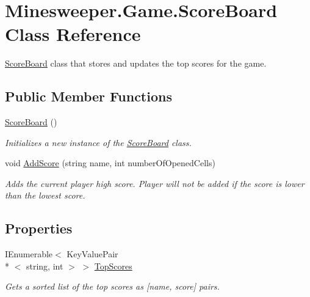 \hypertarget{class_minesweeper_1_1_game_1_1_score_board}{\section{Minesweeper.\+Game.\+Score\+Board Class Reference}
\label{class_minesweeper_1_1_game_1_1_score_board}
}


\hyperlink{class_minesweeper_1_1_game_1_1_score_board}{Score\+Board} class that stores and updates the top scores for the game.  


\subsection*{Public Member Functions}
\begin{DoxyCompactItemize}
\item 
\hyperlink{class_minesweeper_1_1_game_1_1_score_board_a30a6adbef4b4a9c0c7720df2725d3bf5}{Score\+Board} ()
\begin{DoxyCompactList}\small\item\em Initializes a new instance of the \hyperlink{class_minesweeper_1_1_game_1_1_score_board}{Score\+Board} class. \end{DoxyCompactList}\item 
void \hyperlink{class_minesweeper_1_1_game_1_1_score_board_acb8f228b35af71c1bd91012e32be4283}{Add\+Score} (string name, int number\+Of\+Opened\+Cells)
\begin{DoxyCompactList}\small\item\em Adds the current player high score. Player will not be added if the score is lower than the lowest score. \end{DoxyCompactList}\end{DoxyCompactItemize}
\subsection*{Properties}
\begin{DoxyCompactItemize}
\item 
I\+Enumerable$<$ Key\+Value\+Pair\\*
$<$ string, int $>$ $>$ \hyperlink{class_minesweeper_1_1_game_1_1_score_board_a009d2aa35647d16eb0b6aa89943d01ac}{Top\+Scores}
\begin{DoxyCompactList}\small\item\em Gets a sorted list of the top scores as \mbox{[}name, score\mbox{]} pairs. \end{DoxyCompactList}\end{DoxyCompactItemize}


